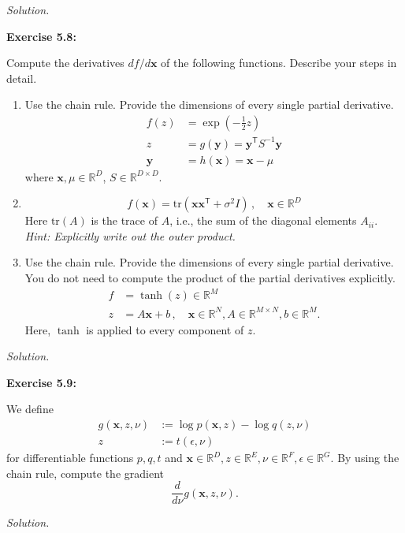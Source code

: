 \documentclass[12pt, a4paper]{article}
\newcommand{\R}{\mathbb{R}}        %
\newcommand{\bx}{\bm{x}}           %
\newcommand{\by}{\bm{y}}           %
\newcommand{\T}{\mathsf{T}}                      %
\newenvironment{problem}[1][Problem]{\noindent\textbf{#1:}\par\vspace{0.5em}}{\vspace{1em}}
\newenvironment{solution}{\noindent\textit{Solution.}\par\vspace{0.5em}}{\vspace{2em}}
\begin{document}
\begin{solution}
\end{solution}
\newpage

\begin{problem}[Exercise 5.8]
  Compute the derivatives $df/d\bx$ of the following functions. Describe your steps in detail.
  \begin{enumerate}[label=\alph*.]
    \item Use the chain rule. Provide the dimensions of every single partial derivative.
    \begin{align*}
      f(z) &= \exp(-\frac{1}{2}z) \\
      z &= g(\by) = \by^\T S^{-1} \by \\
      \by &= h(\bx) = \bx - \mu
    \end{align*}
    where $\bx, \mu \in \R^D$, $S \in \R^{D \times D}$.
    
    \item 
    \[
      f(\bx) = \text{tr}(\bx\bx^\T + \sigma^2 I) \,, \quad \bx \in \R^D
    \]
    Here $\text{tr}(A)$ is the trace of $A$, i.e., the sum of the diagonal elements $A_{ii}$. \\
    \textit{Hint: Explicitly write out the outer product.}
    
    \item Use the chain rule. Provide the dimensions of every single partial derivative. You do not need to compute the product of the partial derivatives explicitly.
    \begin{align*}
      f &= \tanh(z) \in \R^M \\
      z &= A\bx + b \,, \quad \bx \in \R^N, A \in \R^{M \times N}, b \in \R^M.
    \end{align*}
    Here, $\tanh$ is applied to every component of $z$.
  \end{enumerate}
\end{problem}

\begin{solution}
\end{solution}
\newpage

\begin{problem}[Exercise 5.9]
  We define
  \begin{align*}
    g(\bx, z, \nu) &:= \log p(\bx, z) - \log q(z, \nu) \\
    z &:= t(\epsilon, \nu)
  \end{align*}
  for differentiable functions $p, q, t$ and $\bx \in \R^D, z \in \R^E, \nu \in \R^F, \epsilon \in \R^G$. By using the chain rule, compute the gradient
  \[
    \frac{d}{d\nu} g(\bx, z, \nu).
  \]
\end{problem}

\begin{solution}
\end{solution}
\end{document}
